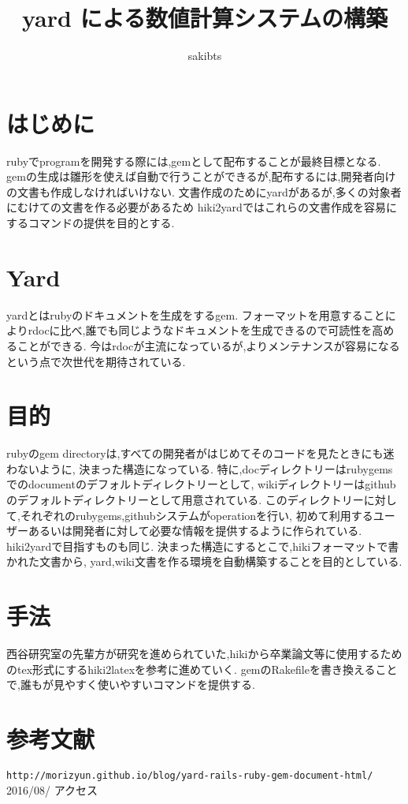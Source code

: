 \documentclass[10pt,a4j,twocolumn]{jsarticle}
\begin{document}
\title{yard による数値計算システムの構築}
\author{sakibts}
\date{}
\maketitle
\section{はじめに}
rubyでprogramを開発する際には,gemとして配布することが最終目標となる.
gemの生成は雛形を使えば自動で行うことができるが,配布するには,開発者向けの文書も作成しなければいけない.
文書作成のためにyardがあるが,多くの対象者にむけての文書を作る必要があるため
hiki2yardではこれらの文書作成を容易にするコマンドの提供を目的とする.

\section{Yard}
yardとはrubyのドキュメントを生成をするgem.
フォーマットを用意することによりrdocに比べ,誰でも同じようなドキュメントを生成できるので可読性を高めることができる.
今はrdocが主流になっているが,よりメンテナンスが容易になるという点で次世代を期待されている.

\section{目的}
rubyのgem directoryは,すべての開発者がはじめてそのコードを見たときにも迷わないように,
決まった構造になっている.
特に,docディレクトリーはrubygemsでのdocumentのデフォルトディレクトリーとして,
wikiディレクトリーはgithubのデフォルトディレクトリーとして用意されている.
このディレクトリーに対して,それぞれのrubygems,githubシステムがoperationを行い,
初めて利用するユーザーあるいは開発者に対して必要な情報を提供するように作られている.
hiki2yardで目指すものも同じ.
決まった構造にするとこで,hikiフォーマットで書かれた文書から,
yard,wiki文書を作る環境を自動構築することを目的としている.

\section{手法}
西谷研究室の先輩方が研究を進められていた,hikiから卒業論文等に使用するためのtex形式にするhiki2latexを参考に進めていく.
gemのRakefileを書き換えることで,誰もが見やすく使いやすいコマンドを提供する.

\section{参考文献}
\verb|http://morizyun.github.io/blog/yard-rails-ruby-gem-document-html/|
2016/08/  アクセス
\end{document}
